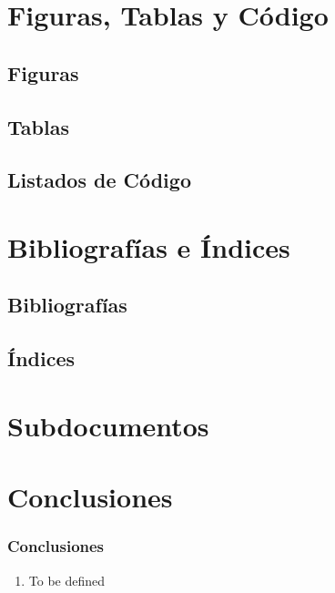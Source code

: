 \documentclass[a4paper,slidestop,xcolor=pst,dvips,blue]{beamer}
\begin{document}
\section{Figuras, Tablas y Código}

\subsection{Figuras}

\subsection{Tablas}

\subsection{Listados de Código}

\section{Bibliografías e Índices}

\subsection{Bibliografías}

\subsection{Índices}

\section{Subdocumentos}

\section{Conclusiones}

\begin{frame}[c]
	\frametitle{Conclusiones}
	\begin{enumerate}[<+->]
		\item To be defined
	\end{enumerate}
\end{frame}

%    
%    
\end{document}
